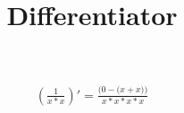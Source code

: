 \documentclass{article}
\title{Differentiator}
\begin{document}
\maketitle
\begin{eqnarray}
\left( \frac{{1}}{{{x}}*{{x}}}\right) ' = 
\frac{{({0}}-{{({x}}+{{x})})}}{{{{x}}*{{x}}}*{{{x}}*{{x}}}}\end{eqnarray}
\end{document}
